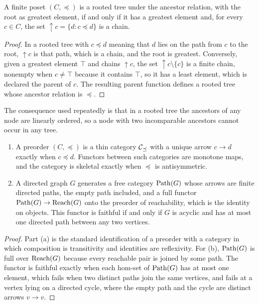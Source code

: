 \begin{proposition}\label{prop:treeposet}
A finite poset $(C,\preceq)$ is a rooted tree under the ancestor relation, with the root as greatest element, if and only if it has a greatest element and, for every $c\in C$, the set ${\uparrow}c=\{d: c\preceq d\}$ is a chain.
\end{proposition}
\begin{proof}
In a rooted tree with $c\preceq d$ meaning that $d$ lies on the path from $c$ to the root, ${\uparrow}c$ is that path, which is a chain, and the root is greatest. Conversely, given a greatest element $\top$ and chains ${\uparrow}c$, the set ${\uparrow}c\setminus\{c\}$ is a finite chain, nonempty when $c\neq\top$ because it contains $\top$, so it has a least element, which is declared the parent of $c$. The resulting parent function defines a rooted tree whose ancestor relation is $\preceq$.
\end{proof}

The consequence used repeatedly is that in a rooted tree the ancestors of any node are linearly ordered, so a node with two incomparable ancestors cannot occur in any tree.

\begin{proposition}\label{prop:catfromctx}
\begin{enumerate}[label=(\alph*)]
\item A preorder $(C,\preceq)$ is a thin category $\mathcal C_{\preceq}$ with a unique arrow $c\to d$ exactly when $c\preceq d$. Functors between such categories are monotone maps, and the category is skeletal exactly when $\preceq$ is antisymmetric.
\item A directed graph $G$ generates a free category $\operatorname{Path}(G)$ whose arrows are finite directed paths, the empty path included, and a full functor $\operatorname{Path}(G)\to\operatorname{Reach}(G)$ onto the preorder of reachability, which is the identity on objects. This functor is faithful if and only if $G$ is acyclic and has at most one directed path between any two vertices.
\end{enumerate}
\end{proposition}
\begin{proof}
Part (a) is the standard identification of a preorder with a category in which composition is transitivity and identities are reflexivity. For (b), $\operatorname{Path}(G)$ is full over $\operatorname{Reach}(G)$ because every reachable pair is joined by some path. The functor is faithful exactly when each hom-set of $\operatorname{Path}(G)$ has at most one element, which fails when two distinct paths join the same vertices, and fails at a vertex lying on a directed cycle, where the empty path and the cycle are distinct arrows $v\to v$.
\end{proof}

